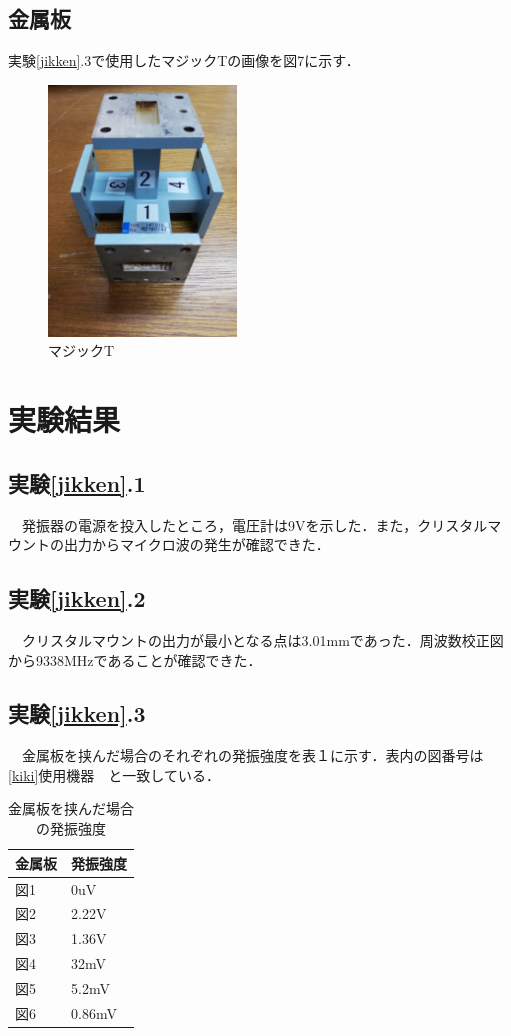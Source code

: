 \subsection{金属板}
実験\ref{jikken}.3で使用したマジックTの画像を図7に示す．
\begin{figure}
  \centering
  \includegraphics[width=5cm]{./data/magicT.jpg}
  \caption{マジックT}
\end{figure}

\newpage


\section{実験結果}
\subsection{実験\ref{jikken}.1}
　発振器の電源を投入したところ，電圧計は9Vを示した．また，クリスタルマウントの出力からマイクロ波の発生が確認できた．

\subsection{実験\ref{jikken}.2}
　クリスタルマウントの出力が最小となる点は3.01mmであった．周波数校正図から9338MHzであることが確認できた．

\subsection{実験\ref{jikken}.3}
　金属板を挟んだ場合のそれぞれの発振強度を表１に示す．表内の図番号は　\ref{kiki}使用機器　と一致している．

  \begin{table}[H]
    \caption{金属板を挟んだ場合の発振強度}
    \centering
      \begin{tabular}{|l|l|}
      \hline
      金属板 & 発振強度   \\ \hline
      図1  & 0uV    \\ \hline
      図2  & 2.22V  \\ \hline
      図3  & 1.36V  \\ \hline
      図4  & 32mV   \\ \hline
      図5  & 5.2mV  \\ \hline
      図6  & 0.86mV \\ \hline
    \end{tabular}
  \end{table}

